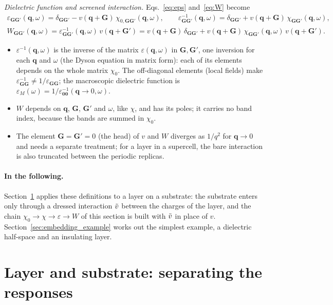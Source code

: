 \documentclass[10pt,a4paper]{paper}
\begin{document}
\emph{Dielectric function and screened interaction.} Eqs.~\eqref{eq:eps} and~\eqref{eq:W} become
\begin{gather}
\varepsilon_{\bm{G}\bm{G}'}(\bm{q},\omega) = \delta_{\bm{G}\bm{G}'} - v(\bm{q} + \bm{G})\,\chi_{0,\bm{G}\bm{G}'}(\bm{q},\omega) ,
\qquad
\varepsilon^{-1}_{\bm{G}\bm{G}'}(\bm{q},\omega) = \delta_{\bm{G}\bm{G}'} + v(\bm{q} + \bm{G})\,\chi_{\bm{G}\bm{G}'}(\bm{q},\omega) ,
\nonumber \\
W_{\bm{G}\bm{G}'}(\bm{q},\omega) = \varepsilon^{-1}_{\bm{G}\bm{G}'}(\bm{q},\omega)\,v(\bm{q} + \bm{G}')
= v(\bm{q} + \bm{G})\,\delta_{\bm{G}\bm{G}'}
+ v(\bm{q} + \bm{G})\,\chi_{\bm{G}\bm{G}'}(\bm{q},\omega)\,v(\bm{q} + \bm{G}') .
\label{eq:eps_W_qG}
\end{gather}
\begin{itemize}
\item $\varepsilon^{-1}(\bm{q},\omega)$ is the inverse of the matrix $\varepsilon(\bm{q},\omega)$ in
  $\bm{G},\bm{G}'$, one inversion for each $\bm{q}$ and $\omega$ (the Dyson equation in matrix form): each of its
  elements depends on the whole matrix $\chi_0$. The off-diagonal elements (local fields) make
  $\varepsilon^{-1}_{\bm{G}\bm{G}} \neq 1/\varepsilon_{\bm{G}\bm{G}}$; the macroscopic dielectric function is
  $\varepsilon_M(\omega) = 1/\varepsilon^{-1}_{\bm{0}\bm{0}}(\bm{q} \to 0,\omega)$.
\item $W$ depends on $\bm{q}$, $\bm{G}$, $\bm{G}'$ and $\omega$, like $\chi$, and has its poles; it carries no band
  index, because the bands are summed in $\chi_0$.
\item The element $\bm{G} = \bm{G}' = 0$ (the head) of $v$ and $W$ diverges as $1/q^2$ for $\bm{q} \to 0$ and needs a
  separate treatment; for a layer in a supercell, the bare interaction is also truncated between the periodic
  replicas.
\end{itemize}

\paragraph{In the following.} Section~\ref{sec:embedding} applies these definitions to a layer on a substrate: the
substrate enters only through a dressed interaction $\tilde{v}$ between the charges of the layer, and the chain
$\chi_0 \to \chi \to \varepsilon \to W$ of this section is built with $\tilde{v}$ in place of $v$.
Section~\ref{sec:embedding_example} works out the simplest example, a dielectric half-space and an insulating layer.

\section{Layer and substrate: separating the responses}
\label{sec:embedding}
\end{document}
